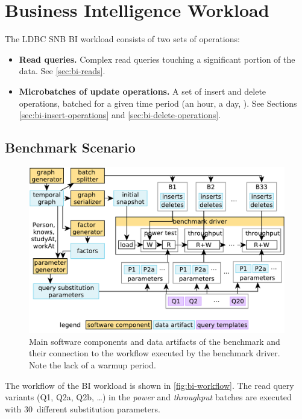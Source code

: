 \chapter{Business Intelligence Workload}
\label{sec:bi}

The LDBC SNB BI workload consists of two sets of operations:

\begin{itemize}
\item \textbf{Read queries.} Complex read queries touching a significant portion of the data. See \autoref{sec:bi-reads}.
\item \textbf{Microbatches of update operations.} A set of insert and delete operations, batched for a given time period (\eg an hour, a day, \etc). See Sections \ref{sec:bi-insert-operations} and \ref{sec:bi-delete-operations}.
\end{itemize}

\section{Benchmark Scenario}
\label{sec:bi-benchmark-scenario}

\begin{figure}[H]
    \centering
    \includegraphics[scale=\yedscale]{figures/bi-workflow}
    \caption{Main software components and data artifacts of the benchmark and their connection to the workflow executed by the benchmark driver. Note the lack of a warmup period.}
    \label{fig:bi-workflow}
\end{figure}

The workflow of the BI workload is shown in \autoref{fig:bi-workflow}.
The read query variants (Q1, Q2a, Q2b, \ldots) in the \emph{power} and \emph{throughput} batches are executed with 30~different substitution parameters.

